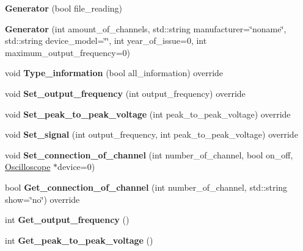\begin{DoxyCompactItemize}
\item 
\mbox{\label{class_generator_a2d8633d5373f6ffd14354428ecd439e4}} 
{\bfseries Generator} (bool file\+\_\+reading)
\item 
\mbox{\label{class_generator_ada37898053cc3a9a8c571bc5d9ea154a}} 
{\bfseries Generator} (int amount\+\_\+of\+\_\+channels, std\+::string manufacturer=\char`\"{}noname\char`\"{}, std\+::string device\+\_\+model=\char`\"{}\char`\"{}, int year\+\_\+of\+\_\+issue=0, int maximum\+\_\+output\+\_\+frequency=0)
\item 
\mbox{\label{class_generator_a326d43c7d97ecabf507b1c0eadb41f6b}} 
void {\bfseries Type\+\_\+information} (bool all\+\_\+information) override
\item 
\mbox{\label{class_generator_a288aa73d0eaac4d0a9399767329bba5b}} 
void {\bfseries Set\+\_\+output\+\_\+frequency} (int output\+\_\+frequency) override
\item 
\mbox{\label{class_generator_a1e1a07ec8ffa4fe1ba50390a9081d49a}} 
void {\bfseries Set\+\_\+peak\+\_\+to\+\_\+peak\+\_\+voltage} (int peak\+\_\+to\+\_\+peak\+\_\+voltage) override
\item 
\mbox{\label{class_generator_add6a7a1444aac7ca035dd81ce1c148ae}} 
void {\bfseries Set\+\_\+signal} (int output\+\_\+frequency, int peak\+\_\+to\+\_\+peak\+\_\+voltage) override
\item 
\mbox{\label{class_generator_ab32772874dbd387f3c659d653e6df38a}} 
void {\bfseries Set\+\_\+connection\+\_\+of\+\_\+channel} (int number\+\_\+of\+\_\+channel, bool on\+\_\+off, \mbox{\hyperlink{class_oscilloscope}{Oscilloscope}} $\ast$device=0)
\item 
\mbox{\label{class_generator_a6afdcdfed120f77ce23f24ccf087fe9a}} 
bool {\bfseries Get\+\_\+connection\+\_\+of\+\_\+channel} (int number\+\_\+of\+\_\+channel, std\+::string show=\char`\"{}no\char`\"{}) override
\item 
\mbox{\label{class_generator_aded8011ae69bf4b8fe624dc029bd25a9}} 
int {\bfseries Get\+\_\+output\+\_\+frequency} ()
\item 
\mbox{\label{class_generator_afe72c1c5daf0c47cd517af8d5fe935b2}} 
int {\bfseries Get\+\_\+peak\+\_\+to\+\_\+peak\+\_\+voltage} ()
\end{DoxyCompactItemize}
